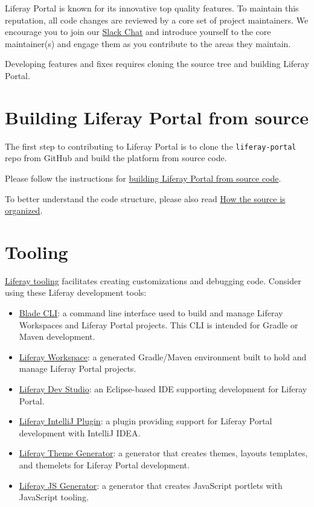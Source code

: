 Liferay Portal is known for its innovative top quality features. To
maintain this reputation, all code changes are reviewed by a core set of
project maintainers. We encourage you to join our
\href{https://liferay-community.slack.com}{Slack Chat} and introduce
yourself to the core maintainer(s) and engage them as you contribute to
the areas they maintain.

Developing features and fixes requires cloning the source tree and
building Liferay Portal.

\section{Building Liferay Portal from
source}\label{building-liferay-portal-from-source}

The first step to contributing to Liferay Portal is to clone the
\texttt{liferay-portal} repo from GitHub and build the platform from
source code.

Please follow the instructions for
\href{https://portal.liferay.dev/participate/fix-a-bug/building-liferay-source}{building
Liferay Portal from source code}.

To better understand the code structure, please also read
\href{https://portal.liferay.dev/participate/fix-a-bug/how-the-source-is-organized}{How
the source is organized}.

\section{Tooling}\label{tooling}

\href{/docs/7-2/reference/-/knowledge_base/r/tooling}{Liferay tooling}
facilitates creating customizations and debugging code. Consider using
these Liferay development tools:

\begin{itemize}
\tightlist
\item
  \href{/docs/7-2/reference/-/knowledge_base/r/blade-cli}{Blade CLI}: a
  command line interface used to build and manage Liferay Workspaces and
  Liferay Portal projects. This CLI is intended for Gradle or Maven
  development.
\item
  \href{/docs/7-2/reference/-/knowledge_base/r/liferay-workspace}{Liferay
  Workspace}: a generated Gradle/Maven environment built to hold and
  manage Liferay Portal projects.
\item
  \href{/docs/7-2/reference/-/knowledge_base/r/liferay-dev-studio}{Liferay
  Dev Studio}: an Eclipse-based IDE supporting development for Liferay
  Portal.
\item
  \href{/docs/7-2/reference/-/knowledge_base/r/intellij}{Liferay
  IntelliJ Plugin}: a plugin providing support for Liferay Portal
  development with IntelliJ IDEA.
\item
  \href{/docs/7-2/reference/-/knowledge_base/r/theme-generator}{Liferay
  Theme Generator}: a generator that creates themes, layouts templates,
  and themelets for Liferay Portal development.
\item
  \href{/docs/7-2/reference/-/knowledge_base/r/js-generator}{Liferay JS
  Generator}: a generator that creates JavaScript portlets with
  JavaScript tooling.
\end{itemize}

